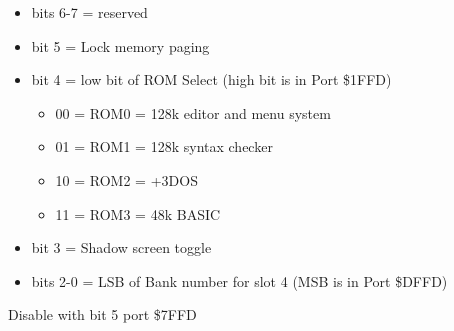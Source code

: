 \begin{itemize}
\item[] bits 6-7 = reserved
\item[] bit 5 = Lock memory paging
\item[] bit 4 = low bit of ROM Select (high bit is in Port \$1FFD) 
  \begin{itemize}
  \item[] 00 = ROM0 = 128k editor and menu system
  \item[] 01 = ROM1 = 128k syntax checker
  \item[] 10 = ROM2 = +3DOS
  \item[] 11 = ROM3 = 48k BASIC
  \end{itemize}
\item[] bit 3 = Shadow screen toggle
\item[] bits 2-0 = LSB of Bank number for slot 4 (MSB is in Port \$DFFD)
\end{itemize}
Disable with bit 5 port \$7FFD

